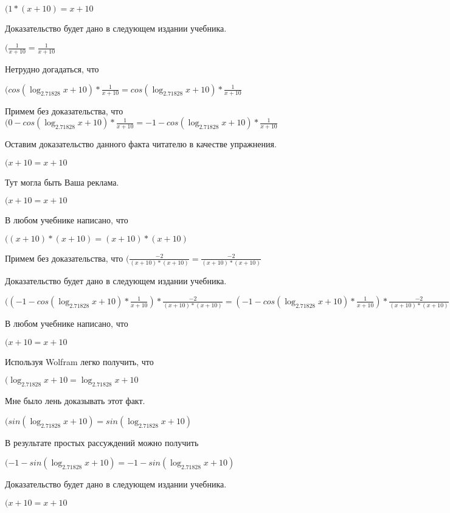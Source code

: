 \documentclass[12pt,a4paper,fleqn]{article}
\theoremstyle{definition}
\begin{document}
$( 1  * ( x  +  10 ) =  x  +  10 $

Доказательство будет дано в следующем издании учебника.

$(\frac{ 1 }{ x  +  10 }
 = \frac{ 1 }{ x  +  10 }
$

Нетрудно догадаться, что

$(cos(\log_{ 2.71828 }{ x  +  10 }) * \frac{ 1 }{ x  +  10 }
 = cos(\log_{ 2.71828 }{ x  +  10 }) * \frac{ 1 }{ x  +  10 }
$

Примем без доказательства, что
$( 0  - cos(\log_{ 2.71828 }{ x  +  10 }) * \frac{ 1 }{ x  +  10 }
 =  -1  - cos(\log_{ 2.71828 }{ x  +  10 }) * \frac{ 1 }{ x  +  10 }
$

Оставим доказательство данного факта читателю в качестве упражнения.

$( x  +  10  =  x  +  10 $

Тут могла быть Ваша реклама.

$( x  +  10  =  x  +  10 $

В любом учебнике написано, что

$(( x  +  10 ) * ( x  +  10 ) = ( x  +  10 ) * ( x  +  10 )$

Примем без доказательства, что
$(\frac{ -2 }{( x  +  10 ) * ( x  +  10 )}
 = \frac{ -2 }{( x  +  10 ) * ( x  +  10 )}
$

Доказательство будет дано в следующем издании учебника.

$(( -1  - cos(\log_{ 2.71828 }{ x  +  10 }) * \frac{ 1 }{ x  +  10 }
) * \frac{ -2 }{( x  +  10 ) * ( x  +  10 )}
 = ( -1  - cos(\log_{ 2.71828 }{ x  +  10 }) * \frac{ 1 }{ x  +  10 }
) * \frac{ -2 }{( x  +  10 ) * ( x  +  10 )}
$

В любом учебнике написано, что

$( x  +  10  =  x  +  10 $

Используя Wolfram легко получить, что

$(\log_{ 2.71828 }{ x  +  10 } = \log_{ 2.71828 }{ x  +  10 }$

Мне было лень доказывать этот факт.

$(sin(\log_{ 2.71828 }{ x  +  10 }) = sin(\log_{ 2.71828 }{ x  +  10 })$

В результате простых рассуждений можно получить

$( -1  - sin(\log_{ 2.71828 }{ x  +  10 }) =  -1  - sin(\log_{ 2.71828 }{ x  +  10 })$

Доказательство будет дано в следующем издании учебника.

$( x  +  10  =  x  +  10 $
\end{document}

